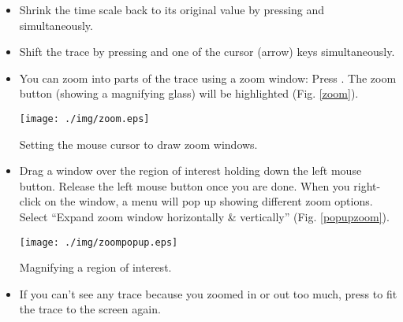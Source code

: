 \begin{itemize}
  \item Shrink the time scale back to its original value by pressing  and \keybox{-} simultaneously.
  \item Shift the trace by pressing  and one of the cursor (arrow) keys simultaneously.
  \item You can zoom into parts of the trace using a zoom window: Press . The zoom button (showing a magnifying glass) will be highlighted (Fig. \ref{zoom}).
  \begin{myfigure}[ht]
    \begin{center}
      \texttt{[image: ./img/zoom.eps]}
    \end{center}
    \caption{Setting the mouse cursor to draw zoom windows.}
    \label{zoom}
  \end{myfigure}
  \item Drag a window over the region of interest holding down the left mouse button. Release the left mouse button once you are done. When you right-click on the window, a menu will pop up showing different zoom options. Select ``Expand zoom window horizontally \& vertically'' (Fig. \ref{popupzoom}).
  \begin{myfigure}[ht]
    \begin{center}
      \texttt{[image: ./img/zoompopup.eps]}
    \end{center}
    \caption{Magnifying a region of interest.}
    \label{popupzoom}
  \end{myfigure}
  \item If you can't see any trace because you zoomed in or out too much, press  to fit the trace to the screen again.
\end{itemize}


